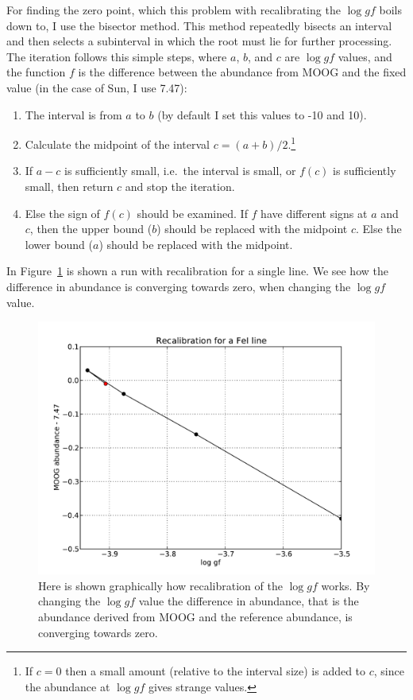 \documentclass{aa}
\begin{document}
For finding the zero point, which this problem with recalibrating the $\log gf$
boils down to, I use the bisector method. This method repeatedly bisects an
interval and then selects a subinterval in which the root must lie for further
processing. The iteration follows this simple steps, where $a$, $b$, and $c$
are $\log gf$ values, and the function $f$ is the difference between the
abundance from MOOG and the fixed value (in the case of Sun, I use 7.47):
\begin{enumerate}
    \item The interval is from $a$ to $b$ (by default I set this values to -10
        and 10).
    \item Calculate the midpoint of the interval $c=(a+b)/2$.\footnote{If $c=0$
            then a small amount (relative to the interval size) is added to
            $c$, since the abundance at $\log gf$ gives strange values.}
    \item If $a-c$ is sufficiently small, i.e.\ the interval is small, or $f(c)$
        is sufficiently small, then return $c$ and stop the iteration.
    \item Else the sign of $f(c)$ should be examined. If $f$ have different
        signs at $a$ and $c$, then the upper bound ($b$) should be replaced
        with the midpoint $c$. Else the lower bound ($a$) should be replaced
        with the midpoint.
\end{enumerate}

In Figure~\ref{fig:recalFe1} is shown a run with recalibration for a single line. We
see how the difference in abundance is converging towards zero, when changing
the $\log gf$ value.
\begin{figure}[htb!]
    \centering
    \includegraphics[width=0.9\linewidth]{figures/recalFeI.pdf}
    \caption{Here is shown graphically how recalibration of the $\log gf$
        works. By changing the $\log gf$ value the difference in abundance,
        that is the abundance derived from MOOG and the reference abundance,
        is converging towards zero.}
\label{fig:recalFe1}
\end{figure}
\end{document}
